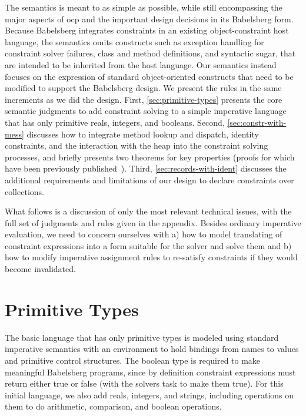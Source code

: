The semantics is meant to as simple as possible, while still encompassing the
major aspects of \gls{ocp} and the important design decisions in its Babelsberg
form. Because Babelsberg integrates constraints in an existing object-constraint
host language, the semantics omits constructs such as exception handling for
constraint solver failures, class and method definitions, and syntactic sugar,
that are intended to be inherited from the host language. Our semantics instead
focuses on the expression of standard object-oriented constructs that need to be
modified to support the Babelsberg design. We present the rules in the same
increments as we did the design. First, \autoref{sec:primitive-types} presents
the core semantic judgments to add constraint solving to a simple imperative
language that has only primitive reals, integers, and booleans. Second,
\autoref{sec:constr-with-mess} discusses how to integrate method lookup and
dispatch, identity constraints, and the interaction with the heap into the
constraint solving processes, and briefly presents two theorems for key
properties (proofs for which have been previously
published~\cite{felgentreff:2014:semantics}). Third,
\autoref{sec:records-with-ident} discusses the additional requirements and
limitations of our design to declare constraints over collections.

What follows is a discussion of only the most relevant technical issues, with
the full set of judgments and rules given in the appendix. Besides ordinary
imperative evaluation, we need to concern ourselves with a) how to model
translating of constraint expressions into a form suitable for the solver and
solve them and b) how to modify imperative assignment rules to re-satisfy
constraints if they would become invalidated.

\section{Primitive Types}
\label{sec:primitive-types}
\renewcommand{\Scope}{E\xspace}

The basic language that has only primitive types is modeled using standard
imperative semantics with an environment to hold bindings from names to values
and primitive control structures. The boolean type is required to make
meaningful Babelsberg programs, since by definition constraint expressions must
return either true or false (with the solvers task to make them true). For this
initial language, we also add reals, integers, and strings, including operations
on them to do arithmetic, comparison, and boolean operations.

